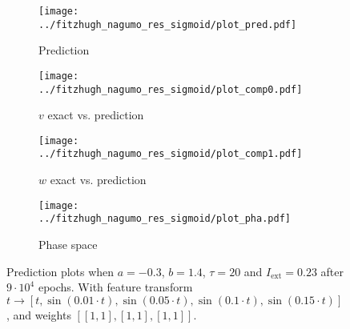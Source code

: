 \documentclass[a4paper]{article}
\begin{document}
\begin{figure}[H]
	\centering 
	\begin{subfigure}[b]{0.47\textwidth}
		\centering
		\texttt{[image: ../fitzhugh\_nagumo\_res\_sigmoid/plot\_pred.pdf]}
		\caption{Prediction}
		\label{fig:all03a}
	\end{subfigure}
	\begin{subfigure}[b]{0.47\textwidth}
		\centering
		\texttt{[image: ../fitzhugh\_nagumo\_res\_sigmoid/plot\_comp0.pdf]}
		\caption{$v$ exact vs. prediction}
		\label{fig:all03b}
	\end{subfigure}
	\begin{subfigure}[b]{0.47\textwidth}
		\centering
		\texttt{[image: ../fitzhugh\_nagumo\_res\_sigmoid/plot\_comp1.pdf]}
		\caption{$w$ exact vs. prediction}
		\label{fig:all03c}
	\end{subfigure}
	\begin{subfigure}[b]{0.47\textwidth}
		\centering
		\texttt{[image: ../fitzhugh\_nagumo\_res\_sigmoid/plot\_pha.pdf]}
		\caption{Phase space}
		\label{fig:all03d}
	\end{subfigure}
	\caption{Prediction plots when $a=-0.3$, $b=1.4$, $\tau=20$ and $ I_{\text{ext}}=0.23$ after $9\cdot10^4$ epochs. With feature transform $t \rightarrow \left[ t, \sin(0.01 \cdot  t), \sin(0.05 \cdot  t), \sin(0.1 \cdot  t), \sin(0.15 \cdot  t)\right] $, and weights $\left[ \left[ 1, 1\right], \left[ 1, 1\right], \left[ 1, 1\right]\right]$.}
	\label{plot:all03}
\end{figure} 	
\end{document}
